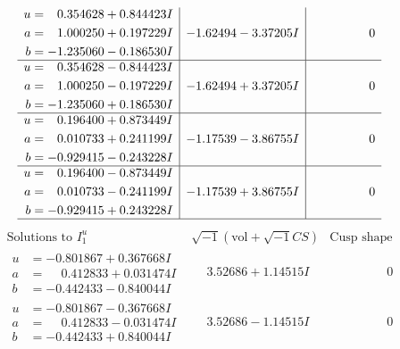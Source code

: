 \documentclass[1p]{elsarticle_modified}
\theoremstyle{definition}
\newcommand{\I}{\sqrt{-1}}
\begin{document}
$$\begin{array}{c|c|c}
\begin{aligned}
u &= \phantom{-}0.354628 + 0.844423 I \\
a &= \phantom{-}1.000250 + 0.197229 I \\
b &= -1.235060 - 0.186530 I\end{aligned}
 & -1.62494 - 3.37205 I & \phantom{-0.000000 } 0 \\ \hline\begin{aligned}
u &= \phantom{-}0.354628 - 0.844423 I \\
a &= \phantom{-}1.000250 - 0.197229 I \\
b &= -1.235060 + 0.186530 I\end{aligned}
 & -1.62494 + 3.37205 I & \phantom{-0.000000 } 0 \\ \hline\begin{aligned}
u &= \phantom{-}0.196400 + 0.873449 I \\
a &= \phantom{-}0.010733 + 0.241199 I \\
b &= -0.929415 - 0.243228 I\end{aligned}
 & -1.17539 - 3.86755 I & \phantom{-0.000000 } 0 \\ \hline\begin{aligned}
u &= \phantom{-}0.196400 - 0.873449 I \\
a &= \phantom{-}0.010733 - 0.241199 I \\
b &= -0.929415 + 0.243228 I\end{aligned}
 & -1.17539 + 3.86755 I & \phantom{-0.000000 } 0\\
 \hline 
 \end{array}$$\newpage$$\begin{array}{c|c|c}  
\text{Solutions to }I^u_{1}& \I (\text{vol} + \sqrt{-1}CS) & \text{Cusp shape}\\
 \hline 
\begin{aligned}
u &= -0.801867 + 0.367668 I \\
a &= \phantom{-}0.412833 + 0.031474 I \\
b &= -0.442433 - 0.840044 I\end{aligned}
 & \phantom{-}3.52686 + 1.14515 I & \phantom{-0.000000 } 0 \\ \hline\begin{aligned}
u &= -0.801867 - 0.367668 I \\
a &= \phantom{-}0.412833 - 0.031474 I \\
b &= -0.442433 + 0.840044 I\end{aligned}
 & \phantom{-}3.52686 - 1.14515 I & \phantom{-0.000000 } 0 \\ \hline\begin{aligned}

\end{aligned}
\end{array}$$
\end{document}
